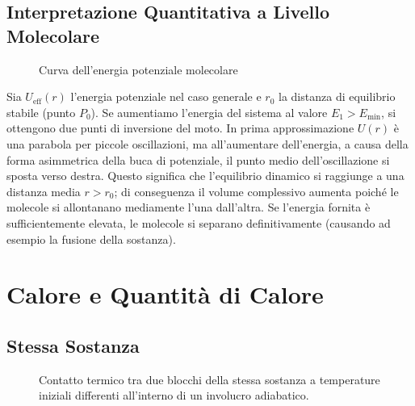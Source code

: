\subsection{Interpretazione Quantitativa a Livello Molecolare}
\begin{figure}[ht]
\centering
{}
\caption{Curva dell'energia potenziale molecolare}
\end{figure}
Sia $U_{\text{eff}}(r)$ l'energia potenziale nel caso generale e $r_0$ la distanza di equilibrio stabile (punto $P_0$).
Se aumentiamo l'energia del sistema al valore $E_1 > E_{\text{min}}$, si ottengono due punti di inversione del moto.
In prima approssimazione $U(r)$ è una parabola per piccole oscillazioni, ma all'aumentare dell'energia, a causa della forma asimmetrica della buca di potenziale, il punto medio dell'oscillazione si sposta verso destra.
Questo significa che l'equilibrio dinamico si raggiunge a una distanza media $r > r_0$; di conseguenza il volume complessivo aumenta poiché le molecole si allontanano mediamente l'una dall'altra. Se l'energia fornita è sufficientemente elevata, le molecole si separano definitivamente (causando ad esempio la fusione della sostanza).

\section{Calore e Quantità di Calore}
\subsection{Stessa Sostanza}

\begin{figure}[ht]
\centering
{}
\caption{Contatto termico tra due blocchi della stessa sostanza a temperature iniziali differenti all'interno di un involucro adiabatico.}
\end{figure}

